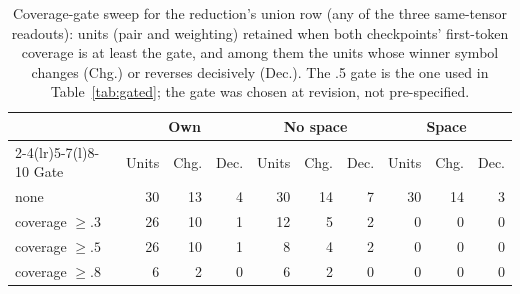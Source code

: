 \begin{table}[t]
\centering\scriptsize
\setlength{\tabcolsep}{4pt}
\begin{tabular}{@{}lrrrrrrrrr@{}}
\toprule
& \multicolumn{3}{c}{Own} & \multicolumn{3}{c}{No space} & \multicolumn{3}{c}{Space} \\
\cmidrule(lr){2-4}\cmidrule(lr){5-7}\cmidrule(l){8-10}
Gate & Units & Chg. & Dec. & Units & Chg. & Dec. & Units & Chg. & Dec. \\
\midrule
none & 30 & 13 & 4 & 30 & 14 & 7 & 30 & 14 & 3 \\
coverage $\ge.3$ & 26 & 10 & 1 & 12 & 5 & 2 & 0 & 0 & 0 \\
coverage $\ge.5$ & 26 & 10 & 1 & 8 & 4 & 2 & 0 & 0 & 0 \\
coverage $\ge.8$ & 6 & 2 & 0 & 6 & 2 & 0 & 0 & 0 & 0 \\
\bottomrule
\end{tabular}
\caption{Coverage-gate sweep for the reduction's union row (any of the three same-tensor readouts): units (pair and weighting) retained when both checkpoints' first-token coverage is at least the gate, and among them the units whose winner symbol changes (Chg.) or reverses decisively (Dec.). The .5 gate is the one used in Table~\ref{tab:gated}; the gate was chosen at revision, not pre-specified.}
\label{tab:gate-sweep}
\end{table}
